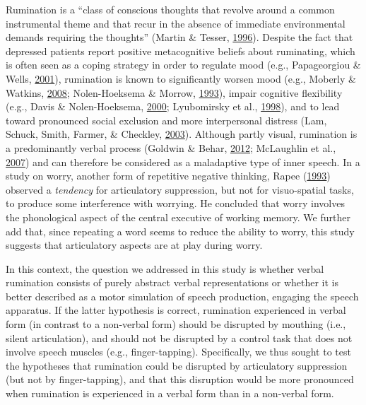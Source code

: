 \documentclass[a4paper,12pt,twoside,openright,oldfontcommands,final]{memoir}
\begin{document}
Rumination is a \enquote{class of conscious thoughts that revolve around a common instrumental theme and that recur in the absence of immediate environmental demands requiring the thoughts} (Martin \& Tesser, \protect\hyperlink{ref-Martin}{1996}). Despite the fact that depressed patients report positive metacognitive beliefs about ruminating, which is often seen as a coping strategy in order to regulate mood (e.g., Papageorgiou \& Wells, \protect\hyperlink{ref-papageorgiou_metacognitive_2001}{2001}), rumination is known to significantly worsen mood (e.g., Moberly \& Watkins, \protect\hyperlink{ref-Moberly2008}{2008}; Nolen-Hoeksema \& Morrow, \protect\hyperlink{ref-nolen-hoeksema_effects_1993}{1993}), impair cognitive flexibility (e.g., Davis \& Nolen-Hoeksema, \protect\hyperlink{ref-Davis2000}{2000}; Lyubomirsky et al., \protect\hyperlink{ref-Lyubomirsky1998}{1998}), and to lead toward pronounced social exclusion and more interpersonal distress (Lam, Schuck, Smith, Farmer, \& Checkley, \protect\hyperlink{ref-lam_response_2003}{2003}). Although partly visual, rumination is a predominantly verbal process (Goldwin \& Behar, \protect\hyperlink{ref-goldwin_concreteness_2012}{2012}; McLaughlin et al., \protect\hyperlink{ref-mclaughlin_effects_2007}{2007}) and can therefore be considered as a maladaptive type of inner speech. In a study on worry, another form of repetitive negative thinking, Rapee (\protect\hyperlink{ref-rapee_utilisation_1993}{1993}) observed a \emph{tendency} for articulatory suppression, but not for visuo-spatial tasks, to produce some interference with worrying. He concluded that worry involves the phonological aspect of the central executive of working memory. We further add that, since repeating a word seems to reduce the ability to worry, this study suggests that articulatory aspects are at play during worry.

In this context, the question we addressed in this study is whether verbal rumination consists of purely abstract verbal representations or whether it is better described as a motor simulation of speech production, engaging the speech apparatus. If the latter hypothesis is correct, rumination experienced in verbal form (in contrast to a non-verbal form) should be disrupted by mouthing (i.e., silent articulation), and should not be disrupted by a control task that does not involve speech muscles (e.g., finger-tapping). Specifically, we thus sought to test the hypotheses that rumination could be disrupted by articulatory suppression (but not by finger-tapping), and that this disruption would be more pronounced when rumination is experienced in a verbal form than in a non-verbal form.
\end{document}
